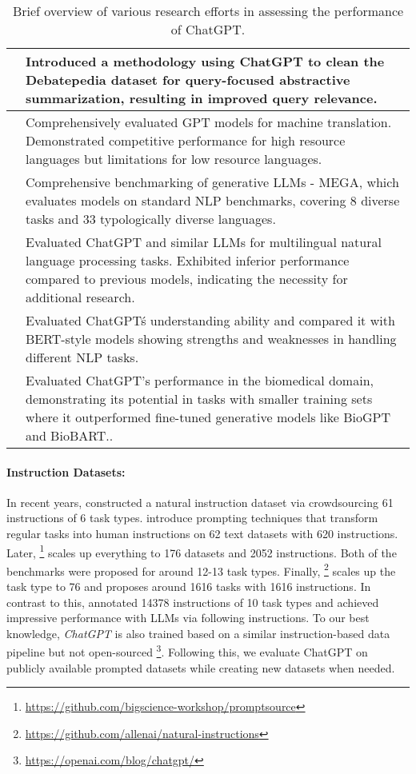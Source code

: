 \documentclass[11pt]{article}
\begin{document}
\begin{table*}
{\begin{tabular}{ll}
    \midrule
    \citet{laskar2023cqsumdp} &  Introduced a methodology using ChatGPT to clean the Debatepedia dataset for query-focused abstractive summarization, resulting in improved query relevance.\\ 
    \midrule
    \citet{hendy2023good} &  Comprehensively evaluated GPT models for machine translation. Demonstrated competitive performance for high resource languages but limitations for low resource languages.\\  
    \midrule
    \citet{ahuja2023mega} &  Comprehensive benchmarking of generative LLMs - MEGA, which evaluates models on standard NLP benchmarks, covering 8 diverse tasks and 33 typologically diverse languages. \\ 
    \midrule
    \citet{lai2023chatgpt} &  Evaluated ChatGPT and similar LLMs for multilingual natural language processing tasks. Exhibited inferior performance compared to previous models, indicating the necessity for additional research.\\
    \midrule
    \citet{zhong2023can} &  Evaluated ChatGPT\'s understanding ability and compared it with BERT-style models  showing strengths and weaknesses in handling different NLP tasks. \\
    \midrule
    \citet{jahan2023evaluation} &  Evaluated ChatGPT's performance in the biomedical domain, demonstrating its potential in tasks with smaller training sets where it outperformed fine-tuned generative models like BioGPT and BioBART.. \\
    
    \bottomrule
    \end{tabular}
}
\caption{Brief overview of various research efforts in assessing the performance of ChatGPT.}
\label{tab:chatgpt_survey}
\end{table*}


%
 
 \paragraph{Instruction Datasets:}
 In recent years, \citet{mishra21}  constructed a natural instruction dataset via crowdsourcing 61 instructions of 6 task types. \citet{FLAN} introduce prompting techniques that transform regular tasks into human instructions on 62 text datasets with 620 instructions. Later, \citet{bach2022promptsource}\footnote{\url{https://github.com/bigscience-workshop/promptsource}} scales up everything to 176 datasets and  2052 instructions. Both of the benchmarks were proposed for around 12-13 task types. 
 Finally, \cite{supernaturalinstructions}\footnote{\url{https://github.com/allenai/natural-instructions}} scales up the task type to 76 and proposes around 1616 tasks with 1616 instructions. In contrast to this, \citet{instructGPT} annotated 14378 instructions of 10 task types and achieved impressive performance with LLMs via following instructions. To our best knowledge, \emph{ChatGPT} is also trained based on a similar instruction-based data pipeline but not open-sourced \footnote{\url{https://openai.com/blog/chatgpt/}}.  Following this, we evaluate ChatGPT on publicly available prompted datasets while creating new datasets when needed.   
\end{document}

